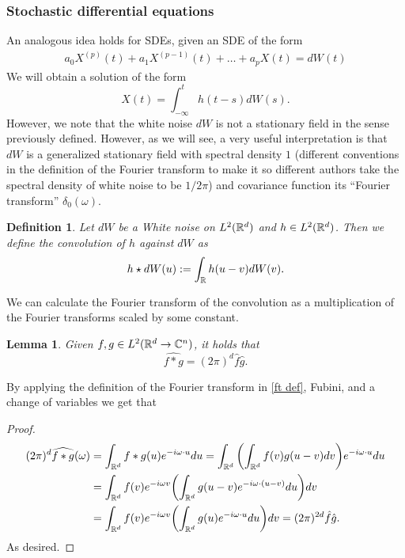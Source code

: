 \documentclass[12pt]{article}
\newtheorem{lemma}{Lemma}
\newtheorem{definition}{Definition}
\begin{document}
\subsubsection{Stochastic differential equations}
An analogous idea holds for SDEs, given an SDE of the form
\begin{align*}\label{diff equation}
	a_0X^{(p)}(t)+a_1X^{(p-1)}(t)+\ldots+a_pX(t)=dW(t)
\end{align*}
We will obtain a solution of the form
\begin{equation*}
	X(t)=\int_{-\infty}^t h(t-s)dW(s).
\end{equation*}
However, we note that the white noise $dW$ is not a stationary field in the sense previously defined. However, as we will see, a very useful interpretation is that $dW$ is a generalized stationary field with spectral density $1$ (different conventions in the definition of the Fourier transform to make it so different authors take the spectral density of white noise to be $1/2\pi$) and covariance function its ``Fourier transform'' $\delta_0(\omega)$.
\begin{definition}
	Let $dW$ be a White noise on $L^2({\mathbb R}^d)$ and $h\in L^2({\mathbb R}^d)$. Then we define the convolution of $h$ against $dW$ as $$h\star dW(u):=\int_{{\mathbb R}} h(u-v)dW(v).$$
\end{definition}
We can calculate the Fourier transform of the convolution as a multiplication of the Fourier transforms scaled by some constant.
\begin{lemma}
	Given $f,g\in L^2({\mathbb R}^d\to\mathbb{C}^n)$, it holds that
	\begin{equation*}
		\widehat{f*g}=(2\pi)^d\hat{f}\hat{g}.
	\end{equation*}
\end{lemma}
By applying the definition of the Fourier transform in \eqref{ft def}, Fubini, and a change of variables we get that
\begin{proof}
	\begin{align*}
		(2\pi)^d \widehat{f*g}(\omega) & =\int_{{\mathbb R}^d} f*g(u)e^{-i\omega\cdot u}du= \int_{{\mathbb R}^d} \qty(\int_{{\mathbb R}^d}f(v)g(u-v)dv)e^{-i \omega\cdot u}du \\
		                               & =\int_{{\mathbb R}^d} f(v)e^{-i\omega v}\qty(\int_{{\mathbb R}^d} g(u-v)e^{-i\omega\cdot (u-v)}du)dv                        \\
		                               & =\int_{{\mathbb R}^d} f(v)e^{-i\omega v}\qty(\int_{{\mathbb R}^d} g(u)e^{-i\omega\cdot u}du)dv
		= (2\pi)^{2d}\hat{f}\hat{g}.
	\end{align*}
	As desired.
\end{proof}
\end{document}
